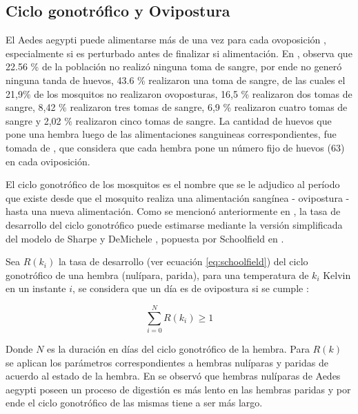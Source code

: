 \subsection{Ciclo gonotrófico y Ovipostura}
\label{subsec:cap4-ciclo-gontrofico-ovipostura}
El Aedes aegypti puede alimentarse más de una vez para cada ovoposición \cite{scott1993detection},
especialmente si es perturbado antes de finalizar si alimentación. En \cite{osoriopontificia},
observa que  22.56 \% de la población no realizó ninguna toma de sangre, por ende no generó
ninguna tanda de huevos,  43.6 \% realizaron una toma de sangre, de las cuales el 21,9\% de los
mosquitos no realizaron ovoposturas, 16,5 \% realizaron dos tomas de sangre, 8,42 \% realizaron
tres tomas de sangre, 6,9 \% realizaron cuatro tomas de sangre y 2,02 \% realizaron cinco tomas de
sangre. La cantidad de huevos que pone una hembra luego de las alimentaciones sanguineas
correspondientes, fue tomada de \cite{otero2006stochastic}, que considera que cada hembra pone un
número fijo de huevos (63) en cada oviposición.

El ciclo gonotrófico de los mosquitos es el nombre que se le adjudico al período que existe desde
que el mosquito realiza una alimentación sangínea - ovipostura - hasta una nueva alimentación.
Como se mencionó anteriormente en , la tasa de desarrollo
del ciclo gonotrófico puede estimarse mediante la versión simplificada del modelo de Sharpe y DeMichele \cite{sharpe1977reaction}, popuesta por Schoolfield en \cite{schoolfield1981non}.

Sea $R(k_{i})$ la tasa de desarrollo (ver ecuación \eqref{eq:schoolfield}) del ciclo gonotrófico
de una hembra (nulípara, parida), para una temperatura de $k_{i}$ Kelvin en un instante $i$, se
considera que un día es de ovipostura si se cumple :

\begin{equation}
\label{eq:ciclo-gonotrofico-ovipostura}
    \sum_{i=0}^{N} R(k_{i}) \geq 1
\end{equation}

Donde $N$ es la duración en días del ciclo gonotrófico de la hembra. Para $R(k)$ se aplican los
parámetros correspondientes a hembras nulíparas y paridas de acuerdo al estado de la hembra.
En \cite{edman1987host} se observó que hembras nulíparas de Aedes aegypti poseen un proceso de
digestión es más lento en las hembras paridas y por ende el ciclo gonotrófico de las mismas tiene
a ser más largo.

